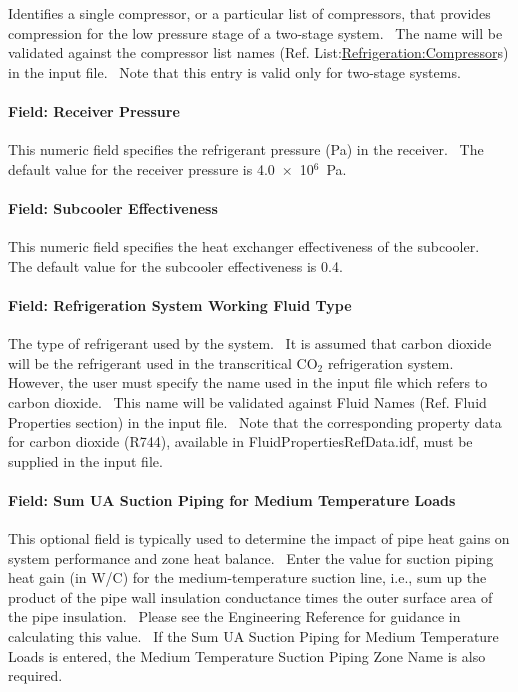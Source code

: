 Identifies a single compressor, or a particular list of compressors, that provides compression for the low pressure stage of a two-stage system.~ The name will be validated against the compressor list names (Ref. List:\hyperref[refrigerationcompressor]{Refrigeration:Compressor}s) in the input file.~ Note that this entry is valid only for two-stage systems.

\paragraph{Field: Receiver Pressure}\label{field-receiver-pressure}

This numeric field specifies the refrigerant pressure (Pa) in the receiver.~ The default value for the receiver pressure is 4.0~×~10\(^{6}\)~Pa.

\paragraph{Field: Subcooler Effectiveness}\label{field-subcooler-effectiveness}

This numeric field specifies the heat exchanger effectiveness of the subcooler.~ The default value for the subcooler effectiveness is 0.4.

\paragraph{Field: Refrigeration System Working Fluid Type}\label{field-refrigeration-system-working-fluid-type-1}

The type of refrigerant used by the system.~ It is assumed that carbon dioxide will be the refrigerant used in the transcritical CO\(_{2}\) refrigeration system.~ However, the user must specify the name used in the input file which refers to carbon dioxide.~ This name will be validated against Fluid Names (Ref. Fluid Properties section) in the input file.~ Note that the corresponding property data for carbon dioxide (R744), available in FluidPropertiesRefData.idf, must be supplied in the input file.

\paragraph{Field: Sum UA Suction Piping for Medium Temperature Loads}\label{field-sum-ua-suction-piping-for-medium-temperature-loads}

This optional field is typically used to determine the impact of pipe heat gains on system performance and zone heat balance.~ Enter the value for suction piping heat gain (in W/C) for the medium-temperature suction line, i.e., sum up the product of the pipe wall insulation conductance times the outer surface area of the pipe insulation.~ Please see the Engineering Reference for guidance in calculating this value.~ If the Sum UA Suction Piping for Medium Temperature Loads is entered, the Medium Temperature Suction Piping Zone Name is also required.

